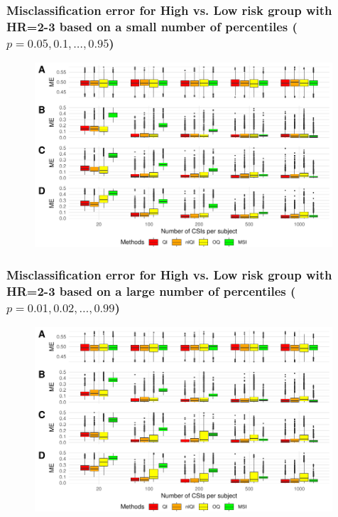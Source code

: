 \documentclass[t,8pt]{beamer}
\begin{document}
\frame
   {\frametitle{Misclassification error for High vs. Low risk group with HR=2-3 based on a small number of percentiles ($p=0.05, 0.1, \dots, 0.95$)}  
    	\begin{figure}
	  \includegraphics[height=2.7in] {Figures/Figures_simulations/ME.box.plots nQ 19HRlabel2-3 pairedsimID 1000.pdf}
	\end{figure}  
}

\frame
   {\frametitle{Misclassification error for High vs. Low risk group with HR=2-3 based on a large number of percentiles ($p=0.01, 0.02, \dots, 0.99$)}  
    	\begin{figure}
	  \includegraphics[height=2.7in] {Figures/Figures_simulations/ME.box.plots nQ 99HRlabel2-3 pairedsimID 1000.pdf}
	\end{figure}  
}


\end{document}
